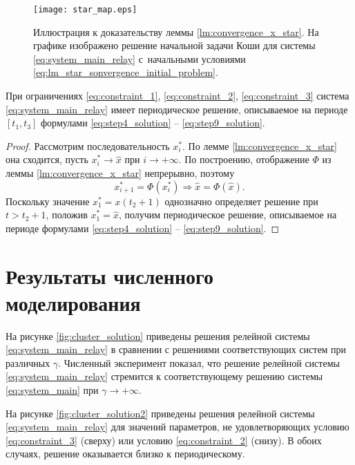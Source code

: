\begin{figure}
	\centering
	\texttt{[image: star\_map.eps]}
	\caption{Иллюстрация к доказательству леммы \ref{lm:convergence_x_star}. На графике изображено решение начальной задачи Коши для системы \eqref{eq:system_main_relay} с~начальными условиями \eqref{eq:lm_star_sonvergence_initial_problem}.}
\end{figure}

\begin{theorem}
	\label{thm:periodic_relay_existence}
	При ограничениях \eqref{eq:constraint_1}, \eqref{eq:constraint_2}, \eqref{eq:constraint_3} система \eqref{eq:system_main_relay} имеет периодическое решение, описываемое на периоде $[t_1, t_3]$ формулами \eqref{eq:step4_solution} -- \eqref{eq:step9_solution}.
\end{theorem}
\begin{proof}
	Рассмотрим последовательность $x^*_i$. По лемме \ref{lm:convergence_x_star} она сходится, пусть $x^*_i \to \hat{x}$ при $i \to +\infty$. По построению, отображение $\Phi$ из леммы \ref{lm:convergence_x_star} непрерывно, поэтому
	\[
	x^*_{i + 1} = \Phi(x^*_i) \Rightarrow \hat{x} = \Phi(\hat{x}).
	\]
	Поскольку значение $x^*_1 = x(t_2 + 1)$ однозначно определяет решение при $t > t_2 + 1$, положив $x^*_1 = \hat{x}$, получим периодическое решение, описываемое на периоде формулами \eqref{eq:step4_solution} -- \eqref{eq:step9_solution}.
\end{proof}

\section{Результаты численного моделирования}\label{sec:ch3/sect5}

На рисунке \ref{fig:cluster_solution} приведены решения релейной системы \eqref{eq:system_main_relay} в сравнении с решениями соответствующих систем при различных $\gamma$. Численный эксперимент показал, что решение релейной системы \eqref{eq:system_main_relay} стремится к соответствующему решению системы \eqref{eq:system_main} при $\gamma \to +\infty$.

На рисунке \ref{fig:cluster_solution2} приведены решения релейной системы \eqref{eq:system_main_relay} для значений параметров, не удовлетворяющих условию \eqref{eq:constraint_3} (сверху) или условию \eqref{eq:constraint_2} (снизу). В обоих случаях, решение оказывается близко к периодическому.

